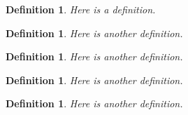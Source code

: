 \documentclass{amsart}
\newtheorem{definition}[theorem]{Definition}
\begin{document}
\begin{definition}
\label{def:1}
Here is a definition.
\end{definition}

\begin{definition}
\label{def:2}
Here is another definition.
\end{definition}

\begin{definition}
\label{def:3}
Here is another definition.
\end{definition}

\begin{definition}
\label{def:4}
Here is another definition.
\end{definition}

\begin{definition}
\label{def:5}
Here is another definition.
\end{definition}
\end{document}
